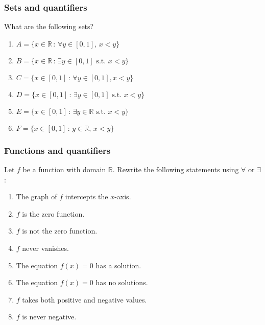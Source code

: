 \documentclass[14pt]{beamer}
\newcommand {\DS} [1] {${\displaystyle #1}$}
\newcommand {\R}{\mathbb{R}}
\begin{document}
\begin{frame}
\frametitle{Sets and quantifiers}

What are the following sets?

	\begin{enumerate}
		\item  \DS{A = \{ x \in \R \, : \, \forall y \in [0,1], \, x < y \} }
		\item  \DS{B = \{ x \in \R \, : \, \exists y \in [0,1] \mbox{ s.t. } x < y \} }
		\item  \DS{C = \{ x \in [0,1] \, : \, \forall y \in [0,1], x < y \} }
		\item  \DS{D = \{ x \in [0,1] \, : \, \exists y \in [0,1] \mbox{ s.t. } x < y \} }
		\item  \DS{E = \{ x \in [0,1] \, : \, \exists y \in \R \mbox{ s.t. } x < y \} }
		\item  \DS{F = \{ x \in [0,1] \, : \, y \in \R, \, x < y \} } 
	\end{enumerate}
\end{frame}

\begin{frame}
\frametitle{Functions and quantifiers}

Let $f$ be a function with domain $\R$.  Rewrite the following statements using $\forall$ or $\exists$:

\begin{enumerate}
	\item  The graph of $f$ intercepts the $x$-axis.
	\item  $f$ is the zero function.
	\item  $f$ is not the zero function.
	\item  $f$ never vanishes.
	\item  The equation \DS{f(x)=0} has a solution.
	\item  The equation \DS{f(x)=0} has no solutions.
	\item $f$ takes both positive and negative values.
	\item $f$ is never negative.
\end{enumerate}


\end{frame}
\end{document}
